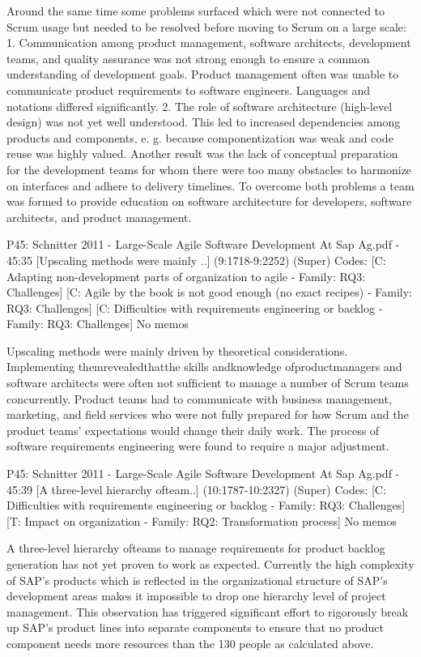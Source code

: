 \documentclass[preprint,authoryear,12pt]{elsarticle}
\begin{document}
Around the same time some problems surfaced which were not connected to Scrum
usage but needed to be resolved before moving to Scrum on a large scale:
1. Communication among product management, software architects, development
teams, and quality assurance was not strong enough to ensure a common understanding of development goals. Product management often was unable to communicate product requirements to software engineers. Languages and notations differed signiﬁcantly.
2. The role of software architecture (high-level design) was not yet well understood.
This led to increased dependencies among products and components, e. g. because
componentization was weak and code reuse was highly valued. Another result was
the lack of conceptual preparation for the development teams for whom there were
too many obstacles to harmonize on interfaces and adhere to delivery timelines.
To overcome both problems a team was formed to provide education on software architecture for developers, software architects, and product management.


P45: Schnitter 2011 - Large-Scale Agile Software Development At Sap Ag.pdf - 45:35 [Upscaling methods were mainly ..]  (9:1718-9:2252)   (Super)
Codes:	[C: Adapting non-development parts of organization to agile - Family: RQ3: Challenges] [C: Agile by the book is not good enough (no exact recipes) - Family: RQ3: Challenges] [C: Difficulties with requirements engineering or backlog - Family: RQ3: Challenges] 
No memos

Upscaling methods were mainly driven by theoretical considerations. Implementing
themrevealedthatthe skills andknowledge ofproductmanagers and software architects
were often not sufﬁcient to manage a number of Scrum teams concurrently. Product
teams had to communicate with business management, marketing, and ﬁeld services
who were not fully prepared for how Scrum and the product teams’ expectations would
change their daily work. The process of software requirements engineering were found
to require a major adjustment.


P45: Schnitter 2011 - Large-Scale Agile Software Development At Sap Ag.pdf - 45:39 [A three-level hierarchy ofteam..]  (10:1787-10:2327)   (Super)
Codes:	[C: Difficulties with requirements engineering or backlog - Family: RQ3: Challenges] [T: Impact on organization - Family: RQ2: Transformation process] 
No memos

A three-level hierarchy ofteams to manage requirements for product backlog generation has not yet proven to work as expected. Currently the high complexity of SAP’s
products which is reﬂected in the organizational structure of SAP’s development areas
makes it impossible to drop one hierarchy level of project management. This observation has triggered signiﬁcant effort to rigorously break up SAP’s product lines into
separate components to ensure that no product component needs more resources than
the 130 people as calculated above.
\end{document}
